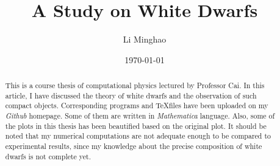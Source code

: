 \documentclass[preprint]{revtex4-1}
\begin{document}
\title{A Study on White Dwarfs}

\author{Li Minghao}

\date{\today}

\begin{abstract}
	This is a course thesis of computational physics lectured by Professor Cai. In this article, I have discussed the theory of white dwarfs and the observation of such compact objects. Corresponding programs and \TeX files have been uploaded on my \emph{Github} homepage. Some of them are written in \emph{Mathematica} language. Also, some of the plots in this thesis has been beautified based on the original plot. It should be noted that my numerical computations are not adequate enough to be compared to experimental results, since my knowledge about the precise composition of white dwarfs is not complete yet. 
\end{abstract}
\pacs{}
\maketitle
\end{document}
